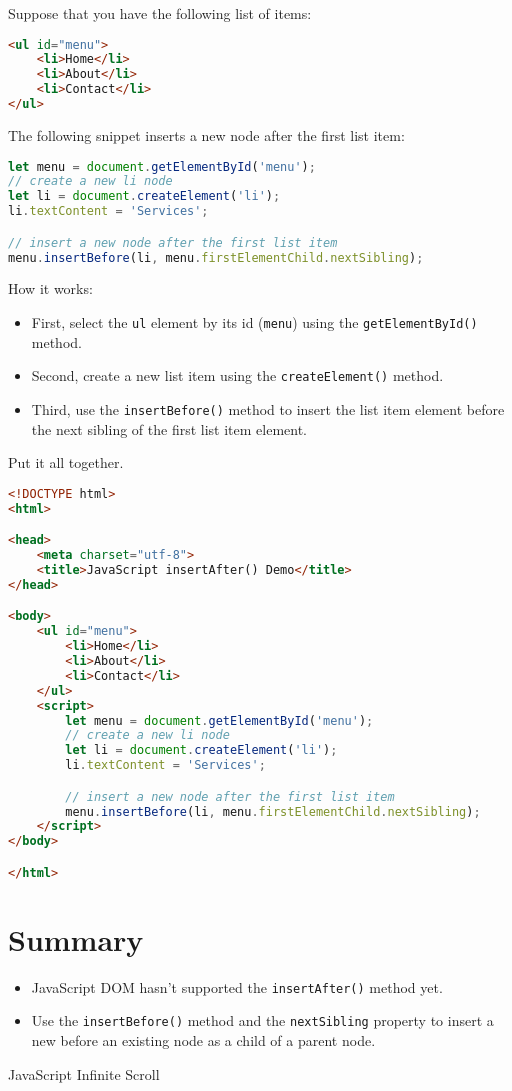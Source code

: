 \documentclass[11pt]{article}
\begin{document}
\noindent
Suppose that you have the following list of items:

\begin{lstlisting}[language=HTML]
<ul id="menu">
    <li>Home</li>   
    <li>About</li>
    <li>Contact</li>
</ul>
\end{lstlisting}

\noindent
The following snippet inserts a new node after the first list item:

\begin{lstlisting}[language=JavaScript]
let menu = document.getElementById('menu');
// create a new li node
let li = document.createElement('li');
li.textContent = 'Services';

// insert a new node after the first list item
menu.insertBefore(li, menu.firstElementChild.nextSibling);
\end{lstlisting}

\newpage

\noindent
How it works:
\begin{itemize}
\item First, select the \verb|ul| element by its id (\verb|menu|) using
the \verb|getElementById()| method.
\item Second, create a new list item using the \verb|createElement()| method.
\item Third, use the \verb|insertBefore()| method to insert the list item element
before the next sibling of the first list item element.
\end{itemize}
Put it all together.

\begin{lstlisting}[language=HTML]
<!DOCTYPE html>
<html>

<head>
    <meta charset="utf-8">
    <title>JavaScript insertAfter() Demo</title>
</head>

<body>
    <ul id="menu">
        <li>Home</li>
        <li>About</li>
        <li>Contact</li>
    </ul>
    <script>
        let menu = document.getElementById('menu');
        // create a new li node
        let li = document.createElement('li');
        li.textContent = 'Services';

        // insert a new node after the first list item
        menu.insertBefore(li, menu.firstElementChild.nextSibling);
    </script>
</body>

</html>
\end{lstlisting}

\section*{Summary}
\begin{itemize}
\item JavaScript DOM hasn't supported the \verb|insertAfter()| method yet.
\item Use the \verb|insertBefore()| method and the \verb|nextSibling| property
to insert a new before an existing node as a child of a parent node.
\end{itemize}
\newpage
\noindent
{}
{\huge JavaScript Infinite Scroll}
\end{document}
